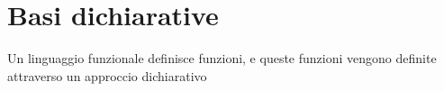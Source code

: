 \section{Basi dichiarative}
Un linguaggio funzionale definisce funzioni, e queste
funzioni vengono definite attraverso un approccio dichiarativo